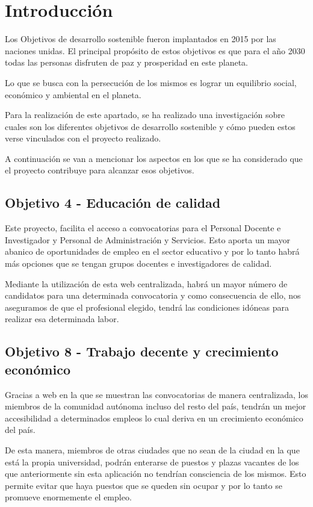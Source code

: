 
\section{Introducción}
Los Objetivos de desarrollo sostenible \cite{ods:latex} fueron implantados en 2015 por las naciones unidas. El principal propósito de estos objetivos es que para el año 2030 todas las personas disfruten de paz y prosperidad en este planeta.

Lo que se busca con la persecución de los mismos es lograr un equilibrio social, económico y ambiental en el planeta.

Para la realización de este apartado, se ha realizado una investigación sobre cuales son los diferentes objetivos de desarrollo sostenible y cómo pueden estos verse vinculados con el proyecto realizado.

A continuación se van a mencionar los aspectos en los que se ha considerado que el proyecto contribuye para alcanzar esos objetivos.

\subsection{Objetivo 4 - Educación de calidad}
Este proyecto, facilita el acceso a convocatorias para el Personal Docente e Investigador y Personal de Administración y Servicios. Esto aporta un mayor abanico de oportunidades de empleo en el sector educativo y por lo tanto habrá más opciones que se tengan grupos docentes e investigadores de calidad.

Mediante la utilización de esta web centralizada, habrá un mayor número de candidatos para una determinada convocatoria y como consecuencia de ello, nos aseguramos de que el profesional elegido, tendrá las condiciones idóneas para realizar esa determinada labor.


\subsection{Objetivo 8 - Trabajo decente y crecimiento económico}

Gracias a web en la que se muestran las convocatorias de manera centralizada, los miembros de la comunidad autónoma incluso del resto del país, tendrán un mejor accesibilidad a determinados empleos lo cual deriva en un crecimiento económico del país.

De esta manera, miembros de otras ciudades que no sean de la ciudad en la que está la propia universidad, podrán enterarse de puestos y plazas vacantes de los que anteriormente sin esta aplicación no tendrían consciencia de los mismos. Esto permite evitar que haya puestos que se queden sin ocupar y por lo tanto se promueve enormemente el empleo.

